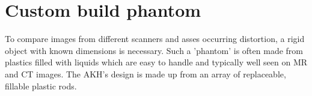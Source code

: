 %


\section{Custom build phantom}

To compare images from different scanners and asses occurring distortion, a rigid object with known dimensions is necessary.
Such a 'phantom' is often made from plastics filled with liquids which are easy to handle and typically well seen on MR and CT images.
The AKH's design is made up from an array of replaceable, fillable plastic rods.

